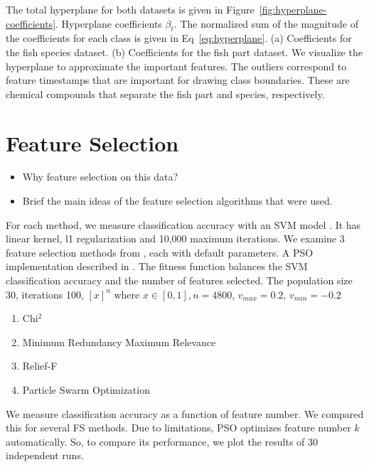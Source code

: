 \documentclass[runningheads]{llncs}
\begin{document}
The total hyperplane for both datasets is given in Figure~\ref{fig:hyperplane-coefficients}.
Hyperplane coefficients $\beta_t$.
The normalized sum of the magnitude of the coefficients for each class is given in Eq~\ref{eq:hyperplane}.
(a) Coefficients for the fish species dataset.
(b) Coefficients for the fish part dataset.
We visualize the hyperplane to approximate the important features. 
The outliers correspond to feature timestamps that are important for drawing class boundaries. 
These are chemical compounds that separate the fish part and species, respectively. 

\section{Feature Selection}


\begin{itemize}
  \item Why feature selection on this data? 
  \item Brief the main ideas of the feature selection algorithms that were used. 
\end{itemize}

For each method, we measure classification accuracy with an SVM model \cite{sklearn2021feature}.
It has linear kernel, l1 regularization \cite{robnik2003theoretical} and 10,000 maximum iterations.
We examine 3 feature selection methods from \cite{li2018feature}, each with default parameters.
A PSO implementation described in \cite{kennedy1995particle}.
The fitness function balances the SVM classification accuracy and the number of features selected.
The population size 30, iterations 100, $[x]^n$ where $x \in [0,1], n = 4800$, $v_{max} = 0.2$, ${v_{min} = -0.2}$

\begin{enumerate}
  \item Chi$^2$ \cite{liu1995chi2}
  \item Minimum Redundancy Maximum Relevance \cite{ding2005minimum}
  \item Relief-F \cite{robnik2003theoretical}
  \item Particle Swarm Optimization \cite{kennedy1995particle}
\end{enumerate}

We measure classification accuracy as a function of feature number.
We compared this for several FS methods.
Due to limitations, PSO optimizes feature number $k$ automatically.
So, to compare its performance, we plot the results of 30 independent runs.
\\\\
\end{document}
